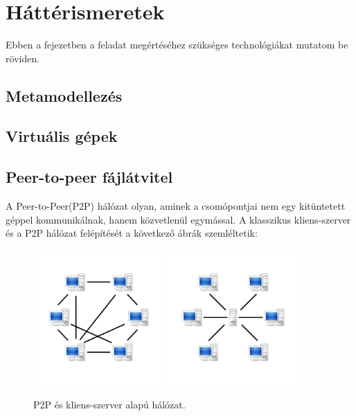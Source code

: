 \chapter{Háttérismeretek}
Ebben a fejezetben a feladat megértéséhez szükséges technológiákat mutatom be röviden. 

\section{Metamodellezés}

\section{Virtuális gépek}

\section{Peer-to-peer fájlátvitel}
A Peer-to-Peer(P2P) hálózat olyan, aminek a csomópontjai nem egy kitüntetett géppel 
kommunikálnak, hanem közvetlenül egymással. A klasszikus kliens-szerver és a P2P hálózat felépítését
a következő ábrák szemléltetik:

\begin{figure}[!ht]
	\centering
	\includegraphics[width=50mm, keepaspectratio]{figures/P2P-network.png}\hspace{1cm}
	\includegraphics[width=50mm, keepaspectratio]{figures/Server-based-network.png}
	\caption{P2P és kliens-szerver alapú hálózat.}%
	\label{fig:HVSpaces}
\end{figure}

